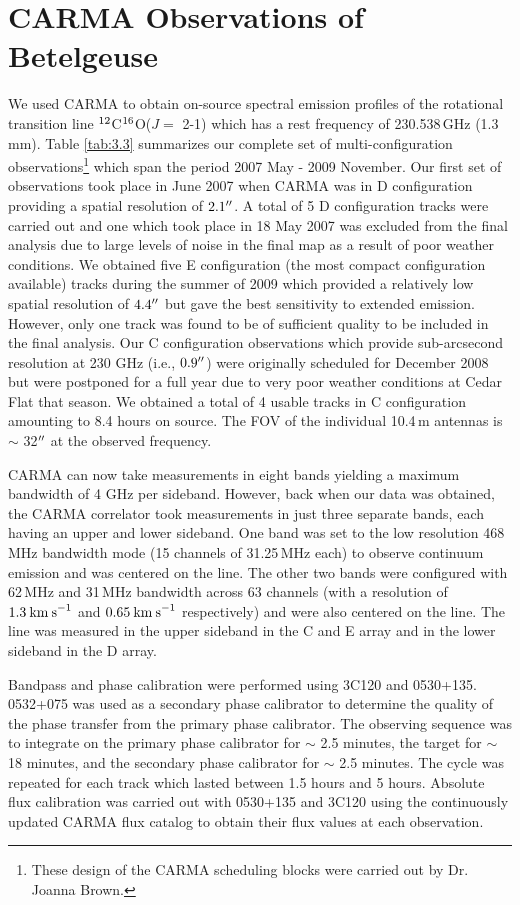 \section{CARMA Observations of Betelgeuse}\label{sec:3.3}
We used CARMA to obtain on-source spectral emission profiles of the rotational transition line $\rm{{}^{12}}$C$\rm{{}^{16}}$O($J=$ 2-1) which has a rest frequency of 230.538\,GHz (1.3\,mm). Table \ref{tab:3.3} summarizes our complete set of multi-configuration observations\footnote{These design of the CARMA scheduling blocks were carried out by Dr. Joanna Brown.} which span the period 2007 May - 2009 November. Our first set of observations took place in June 2007 when CARMA was in D configuration providing a spatial resolution of $2.1^{\prime\prime}$. A total of 5 D configuration tracks were carried out and one which took place in 18 May 2007 was excluded from the final analysis due to large levels of noise in the final map as a result of poor weather conditions. We obtained five E configuration (the most compact configuration available) tracks during the summer of 2009  which provided a relatively low spatial resolution of $4.4^{\prime\prime}$ but gave the best sensitivity to extended emission. However, only one track was found to be of sufficient quality to be included in the final analysis. Our C configuration observations which provide sub-arcsecond resolution at 230 GHz (i.e., $0.9^{\prime\prime}$) were originally scheduled for December 2008 but were postponed for a full year due to very poor weather conditions at  Cedar Flat that season. We obtained a total of 4 usable tracks in C configuration amounting to 8.4 hours on source. The FOV of the individual 10.4\,m antennas is $\sim$ 32$^{\prime\prime}$ at the observed frequency.

CARMA can now take measurements in eight bands yielding a maximum bandwidth of 4 GHz per sideband. However, back when our data was obtained, the CARMA correlator took measurements in just three separate bands, each having an upper and lower sideband. One band was set to the low resolution 468\,MHz bandwidth mode (15 channels of 31.25\,MHz each) to observe continuum emission and was centered on the line. The other two bands were configured with 62\,MHz and 31\,MHz bandwidth across 63 channels (with a resolution of $1.3\>{\rm km\>s}^{-1}$ and $0.65\>{\rm km\>s}^{-1}$ respectively) and were also centered on the line. The line was measured in the upper sideband in the C and E array and in the lower sideband in the D array.

Bandpass and phase calibration were performed using 3C120 and 0530+135. 0532+075 was used as a secondary phase calibrator to determine the quality of the phase transfer from the primary phase calibrator. The observing sequence was to integrate on the primary phase calibrator for $\sim$ 2.5 minutes, the target for $\sim$ 18 minutes, and the secondary phase calibrator for $\sim$ 2.5 minutes. The cycle was repeated for each track which lasted between 1.5 hours and 5 hours. Absolute flux calibration was carried out with 0530+135 and 3C120 using the continuously updated CARMA flux catalog to obtain their flux values at each observation.

